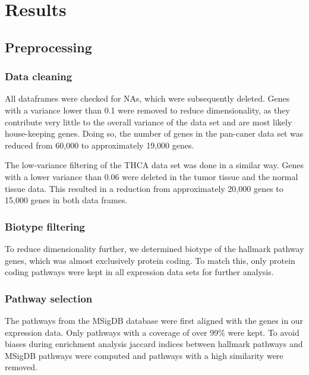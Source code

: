 \documentclass[
  parskip,
  oneside]{scrreprt}
\begin{document}
\hypertarget{results}{%
\chapter{Results}\label{results}}

\hypertarget{preprocessing-1}{%
\section{Preprocessing}\label{preprocessing-1}}

\hypertarget{data-cleaning}{%
\subsection{Data cleaning}\label{data-cleaning}}

All dataframes were checked for NAs, which were subsequently deleted.
Genes with a variance lower than 0.1 were removed to reduce
dimensionality, as they contribute very little to the overall variance
of the data set and are most likely house-keeping genes. Doing so, the
number of genes in the pan-caner data set was reduced from 60,000 to
approximately 19,000 genes.

The low-variance filtering of the THCA data set was done in a similar
way. Genes with a lower variance than 0.06 were deleted in the tumor
tissue and the normal tissue data. This resulted in a reduction from
approximately 20,000 genes to 15,000 genes in both data frames.

\hypertarget{biotype-filtering-1}{%
\subsection{Biotype filtering}\label{biotype-filtering-1}}

To reduce dimensionality further, we determined biotype of the hallmark
pathway genes, which was almost exclusively protein coding. To match
this, only protein coding pathways were kept in all expression data sets
for further analysis.

\hypertarget{pathway-selection}{%
\subsection{Pathway selection}\label{pathway-selection}}

The pathways from the MSigDB database were first aligned with the genes
in our expression data. Only pathways with a coverage of over 99\% were
kept. To avoid biases during enrichment analysis jaccard indices between
hallmark pathways and MSigDB pathways were computed and pathways with a
high similarity were removed.
\end{document}
